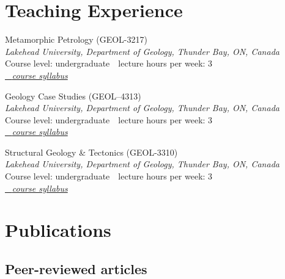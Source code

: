 \documentclass[10pt, paper=letter]{scrartcl} %
\begin{document}
\begin{cv}{}
\section{Teaching Experience}
    \begin{cvlist}{}
        \item[since 2026] Metamorphic Petrology (GEOL-3217) \\
        \textit{Lakehead University, Department of Geology, Thunder Bay, ON, Canada}\\
        Course level: undergraduate~\textbar~lecture hours per week: 3\\
        \href{https://tobiste.github.io/teaching/GEOL3217_Syllabus_2026.pdf}{\textcolor{mygray}{\faDownload~  \textit{course syllabus}}}
        \item[since 2025] Geology Case Studies (GEOL--4313)\\
        \textit{Lakehead University, Department of Geology, Thunder Bay, ON, Canada}\\
        Course level: undergraduate~\textbar~lecture hours per week: 3\\
        \href{https://tobiste.github.io/teaching/GEOL4313_Syllabus_2025.pdf}{\textcolor{mygray}{\faDownload~  \textit{course syllabus}}}
        \item[since 2024] Structural Geology \& Tectonics (GEOL-3310)\\
        \textit{Lakehead University, Department of Geology, Thunder Bay, ON, Canada}\\
        Course level: undergraduate~\textbar~lecture hours per week: 3\\
        \href{https://tobiste.github.io/teaching/GEOL3310_Syllabus_2025.pdf}{\textcolor{mygray}{\faDownload~  \textit{course syllabus}}}
    \end{cvlist}

    \section{Publications}
    \subsection{Peer-reviewed articles}
    \begingroup
    \setlength{\cvlabelwidth}{1em}
    \setul{1pt}{.4pt}%
    \begin{cvlist}{}


\end{cvlist}
\end{cv}
\end{document}
